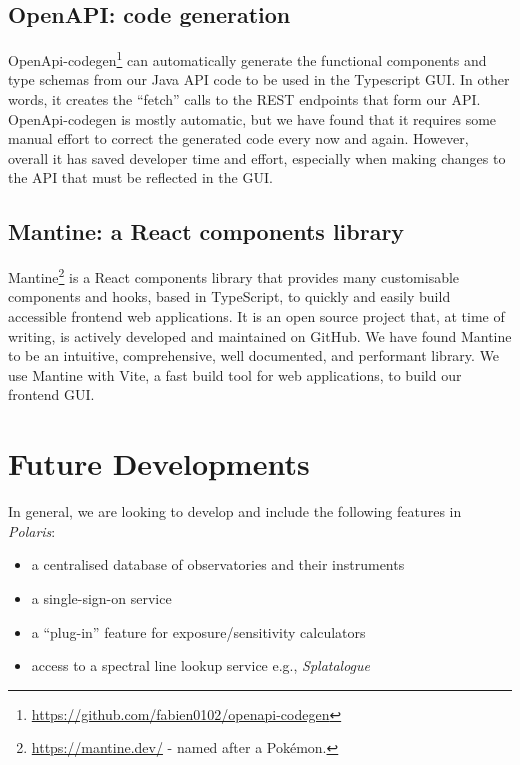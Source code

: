 \documentclass[11pt,twoside]{article}
\begin{document}
\subsection{OpenAPI: code generation}\label{subsec:openapi-code-generation}

OpenApi-codegen\footnote{\url{https://github.com/fabien0102/openapi-codegen}} can automatically generate the functional components and type schemas from
our Java API code to be used in the Typescript GUI\@.
In other words, it creates the ``fetch'' calls to the REST endpoints that form our API\@.
OpenApi-codegen is mostly automatic, but we have found that it requires some manual effort to correct
the generated code every now and again.
However, overall it has saved developer time and effort, especially when making changes to the API that must be
reflected in the GUI\@.

\subsection{Mantine: a React components library}\label{subsec:mantine:-a-react-components-library}

Mantine\footnote{\url{https://mantine.dev/} - named after a Pok\'emon.} is a React components library that
provides many customisable components and hooks, based in TypeScript, to quickly and easily build accessible
frontend web applications.
It is an open source project that, at time of writing, is actively developed and maintained on GitHub.
We have found Mantine to be an intuitive, comprehensive, well documented, and performant library.
We use Mantine with Vite, a fast build tool for web applications, to build our frontend GUI\@.

\section{Future Developments}\label{sec:future-developments}

In general, we are looking to develop and include the following features in \emph{Polaris}:

\begin{itemize}
    \item a centralised database of observatories and their instruments
    \item a single-sign-on service
    \item a ``plug-in'' feature for exposure/sensitivity calculators
    \item access to a spectral line lookup service e.g., \emph{Splatalogue}
\end{itemize}
\end{document}
